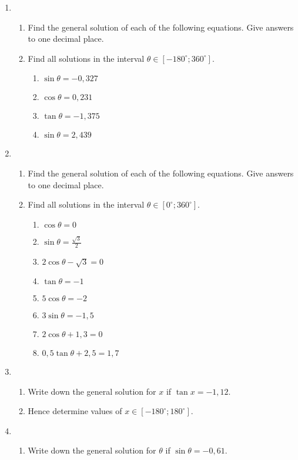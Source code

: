 {
\begin{enumerate}
\item 
	\begin{enumerate}
	\item Find the general solution of each of the following equations. Give answers to one decimal place.
	\item Find all solutions in the interval $\theta \in [-180^\circ ;360^\circ].$
		\begin{enumerate}
		\item $\sin \theta = -0,327$
		\item $\cos\theta = 0,231$
		\item $\tan\theta = -1,375$
		\item $\sin\theta = 2,439$
		\end{enumerate}
	\end{enumerate}
\item 
	\begin{enumerate}
	\item Find the general solution of each of the following equations. Give answers to one decimal place.
	\item Find all solutions in the interval $\theta \in [0^\circ ;360^\circ].$
		\begin{enumerate}
		\item $\cos\theta = 0$
		\item $\sin\theta = \frac{\sqrt{3}}{2}$
		\item $2\cos\theta -\sqrt{3} = 0$
		\item $\tan\theta = -1 $
		\item $5\cos\theta = -2$
		\item $3\sin\theta=-1,5$
		\item $2\cos\theta+1,3=0$
		\item $0,5\tan\theta +2,5=1,7$
		\end{enumerate}
	\end{enumerate}
\item 
	\begin{enumerate}
	\item Write down the general solution for $x$ if $\tan x = -1,12$.
	\item Hence determine values of $x \in [-180^\circ;180^\circ]$.
	\end{enumerate}
\item 
	\begin{enumerate}
	\item Write down the general solution for $\theta$ if $\sin \theta = -0,61$.

\end{enumerate}
\end{enumerate}}
